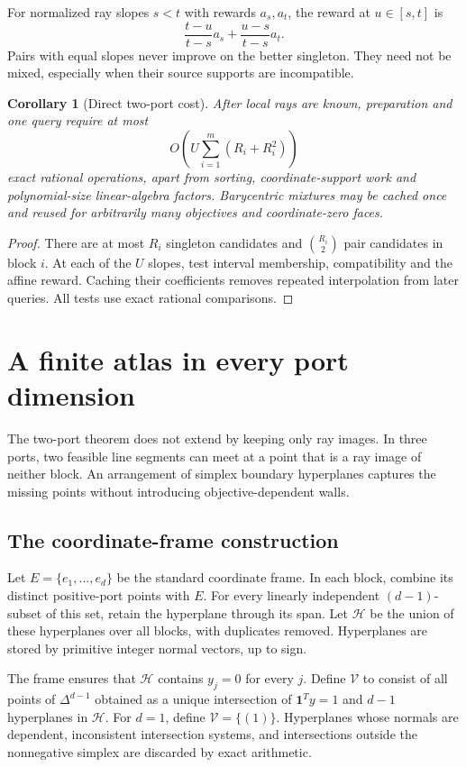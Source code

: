 \documentclass[11pt,a4paper]{article}
\newtheorem{corollary}[theorem]{Corollary}
\theoremstyle{definition}
\theoremstyle{remark}
\newcommand{\one}{\mathbf1}\newcommand{\code}[1]{\texttt{\detokenize{#1}}}
\begin{document}
For normalized ray slopes $s<t$ with rewards $a_s,a_t$, the reward at $u\in[s,t]$ is
\[
 \frac{t-u}{t-s}a_s+\frac{u-s}{t-s}a_t.
\]
Pairs with equal slopes never improve on the better singleton. They need not be mixed, especially when their source supports are incompatible.

\begin{corollary}[Direct two-port cost]
\label{cor:two-cost}
After local rays are known, preparation and one query require at most
\[
 O\!\left(U\sum_{i=1}^m(R_i+R_i^2)\right)
\]
exact rational operations, apart from sorting, coordinate-support work and polynomial-size linear-algebra factors. Barycentric mixtures may be cached once and reused for arbitrarily many objectives and coordinate-zero faces.
\end{corollary}
\begin{proof}
There are at most $R_i$ singleton candidates and $\binom{R_i}{2}$ pair candidates in block $i$. At each of the $U$ slopes, test interval membership, compatibility and the affine reward. Caching their coefficients removes repeated interpolation from later queries. All tests use exact rational comparisons.
\end{proof}

\section{A finite atlas in every port dimension}
\label{sec:atlas}
The two-port theorem does not extend by keeping only ray images. In three ports, two feasible line segments can meet at a point that is a ray image of neither block. An arrangement of simplex boundary hyperplanes captures the missing points without introducing objective-dependent walls.

\subsection{The coordinate-frame construction}
Let $E=\{e_1,\ldots,e_d\}$ be the standard coordinate frame. In each block, combine its distinct positive-port points with $E$. For every linearly independent $(d-1)$-subset of this set, retain the hyperplane through its span. Let $\mathcal H$ be the union of these hyperplanes over all blocks, with duplicates removed. Hyperplanes are stored by primitive integer normal vectors, up to sign.

The frame ensures that $\mathcal H$ contains $y_j=0$ for every $j$. Define $\mathcal V$ to consist of all points of $\Delta^{d-1}$ obtained as a unique intersection of $\one^Ty=1$ and $d-1$ hyperplanes in $\mathcal H$. For $d=1$, define $\mathcal V=\{(1)\}$. Hyperplanes whose normals are dependent, inconsistent intersection systems, and intersections outside the nonnegative simplex are discarded by exact arithmetic.
\end{document}
